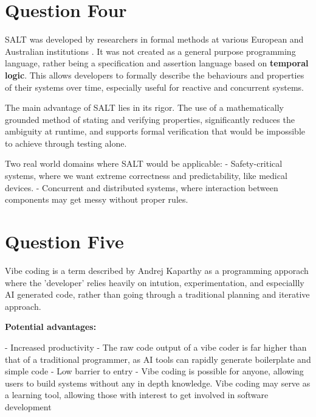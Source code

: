\documentclass[10pt,a4paper]{article}
\begin{document}
\section{Question Four}

SALT was developed by researchers in formal methods at various European and Australian institutions \citep{salt}. \newline It was not created as a general purpose programming language, rather being a specification and assertion language based on \textbf{temporal logic}. This allows developers to formally describe the behaviours and properties of their systems over time, especially useful for reactive and concurrent systems.

The main advantage of SALT lies in its rigor. The use of a mathematically grounded method of stating and verifying properties, significantly reduces the ambiguity at runtime, and supports formal verification that would be impossible to achieve through testing alone.

Two real world domains where SALT would be applicable:
 \newline - Safety-critical systems, where we want extreme correctness and predictability, like medical devices.
 \newline - Concurrent and distributed systems, where interaction between components may get messy without proper rules.

\section{Question Five}

Vibe coding is a term described by Andrej Kaparthy \citep{karpathy_vibe} as a programming apporach where the 'developer' relies heavily on intution, experimentation, and especiallly AI generated code, rather than going through a traditional planning and iterative approach.

\textbf{Potential advantages:}

\newline - Increased productivity - The raw code output of a vibe coder is far higher than that of a traditional programmer, as AI tools can rapidly generate boilerplate and simple code
\newline - Low barrier to entry - Vibe coding is possible for anyone, allowing users to build systems without any in depth knowledge. Vibe coding may serve as a learning tool, allowing those with interest to get involved in software development
\end{document}
